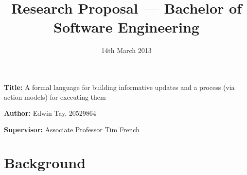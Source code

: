 \documentclass[12pt, a4paper]{article}
\title{Research Proposal --- Bachelor of Software Engineering}
\date{14th March 2013}
\newcommand{\namelistlabel}[1]{\mbox{#1}\hfil}
\newenvironment{namelist}[1]{%
\begin{list}{}
    {
        \let\makelabel\namelistlabel
        \settowidth{\labelwidth}{#1}
        \setlength{\leftmargin}{1.1\labelwidth}
    }
  }{%
\end{list}}
\begin{document}
\maketitle

\begin{namelist}{}
\item[{\bf Title:}]
	A formal language for building informative updates and a process (via
  action models) for executing them
  \item[{\bf Author:}]
	Edwin Tay, 20529864
\item[{\bf Supervisor:}]
	Associate Professor Tim French
\end{namelist}

\section*{Background}
\end{document}
